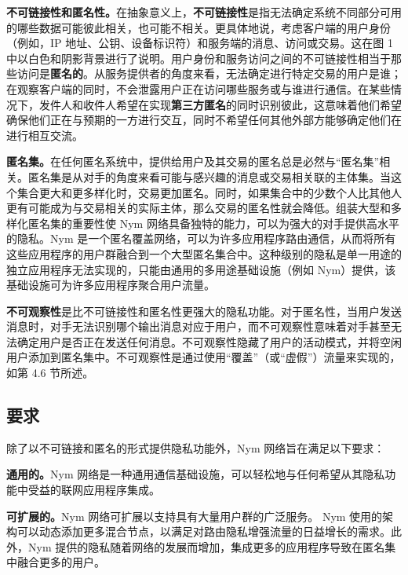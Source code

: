 \documentclass{article}
\begin{document}
	\textbf{不可链接性和匿名性。}在抽象意义上，\textbf{不可链接性}是指无法确定系统不同部分可用的哪些数据可能彼此相关，也可能不相关\cite{ref87}。更具体地说，考虑客户端的用户身份（例如，IP 地址、公钥、设备标识符）和服务端的消息、访问或交易。这在图 1 中以白色和阴影背景进行了说明。用户身份和服务访问之间的不可链接性相当于那些访问是\textbf{匿名的}。从服务提供者的角度来看，无法确定进行特定交易的用户是谁；在观察客户端的同时，不会泄露用户正在访问哪些服务或与谁进行通信。在某些情况下，发件人和收件人希望在实现\textbf{第三方匿名}的同时识别彼此，这意味着他们希望确保他们正在与预期的一方进行交互，同时不希望任何其他外部方能够确定他们在进行相互交流。\newline

	\textbf{匿名集。}在任何匿名系统中，提供给用户及其交易的匿名总是必然与“匿名集”相关\cite{ref87}。匿名集是从对手的角度来看可能与感兴趣的消息或交易相关联的主体集。当这个集合更大和更多样化时，交易更加匿名。同时，如果集合中的少数个人比其他人更有可能成为与交易相关的实际主体，那么交易的匿名性就会降低\cite{ref38, ref94}。组装大型和多样化匿名集的重要性使 Nym 网络具备独特的能力，可以为强大的对手提供高水平的隐私。Nym 是一个匿名覆盖网络，可以为许多应用程序路由通信，从而将所有这些应用程序的用户群融合到一个大型匿名集合中。这种级别的隐私是单一用途的独立应用程序无法实现的，只能由通用的多用途基础设施（例如 Nym）提供，该基础设施可为许多应用程序聚合用户流量。\newline

	\textbf{不可观察性}是比不可链接性和匿名性更强大的隐私功能。对于匿名性，当用户发送消息时，对手无法识别哪个输出消息对应于用户，而不可观察性意味着对手甚至无法确定用户是否正在发送任何消息。不可观察性隐藏了用户的活动模式，并将空闲用户添加到匿名集中。不可观察性是通过使用“覆盖”（或“虚假”）流量来实现的，如第 4.6 节所述。\newline

	\subsection{要求}

	除了以不可链接和匿名的形式提供隐私功能外，Nym 网络旨在满足以下要求：\newline

	\textbf{通用的。}Nym 网络是一种通用通信基础设施，可以轻松地与任何希望从其隐私功能中受益的联网应用程序集成。\newline

	\textbf{可扩展的。}Nym 网络可扩展以支持具有大量用户群的广泛服务。 Nym 使用的架构可以动态添加更多混合节点，以满足对路由隐私增强流量的日益增长的需求。此外，Nym 提供的隐私随着网络的发展而增加，集成更多的应用程序导致在匿名集中融合更多的用户。\newline
\end{document}
